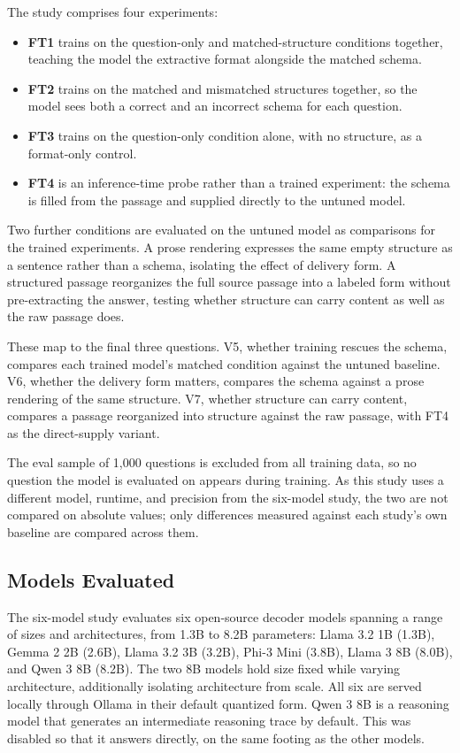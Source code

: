 \documentclass{article}
\begin{document}
The study comprises four experiments:

\begin{itemize}
  \item \textbf{FT1} trains on the question-only and matched-structure conditions together, teaching the model the extractive format alongside the matched schema.
  \item \textbf{FT2} trains on the matched and mismatched structures together, so the model sees both a correct and an incorrect schema for each question.
  \item \textbf{FT3} trains on the question-only condition alone, with no structure, as a format-only control.
  \item \textbf{FT4} is an inference-time probe rather than a trained experiment: the schema is filled from the passage and supplied directly to the untuned model.
\end{itemize}

Two further conditions are evaluated on the untuned model as comparisons for the trained experiments. A prose rendering expresses the same empty structure as a sentence rather than a schema, isolating the effect of delivery form. A structured passage reorganizes the full source passage into a labeled form without pre-extracting the answer, testing whether structure can carry content as well as the raw passage does.

These map to the final three questions. V5, whether training rescues the schema, compares each trained model's matched condition against the untuned baseline. V6, whether the delivery form matters, compares the schema against a prose rendering of the same structure. V7, whether structure can carry content, compares a passage reorganized into structure against the raw passage, with FT4 as the direct-supply variant.

The eval sample of 1,000 questions is excluded from all training data, so no question the model is evaluated on appears during training. As this study uses a different model, runtime, and precision from the six-model study, the two are not compared on absolute values; only differences measured against each study's own baseline are compared across them.

\subsection{Models Evaluated}

The six-model study evaluates six open-source decoder models spanning a range of sizes and architectures, from 1.3B to 8.2B parameters: Llama 3.2 1B (1.3B), Gemma 2 2B (2.6B), Llama 3.2 3B (3.2B), Phi-3 Mini (3.8B), Llama 3 8B (8.0B), and Qwen 3 8B (8.2B). The two 8B models hold size fixed while varying architecture, additionally isolating architecture from scale. All six are served locally through Ollama in their default quantized form. Qwen 3 8B is a reasoning model that generates an intermediate reasoning trace by default. This was disabled so that it answers directly, on the same footing as the other models.
\end{document}
